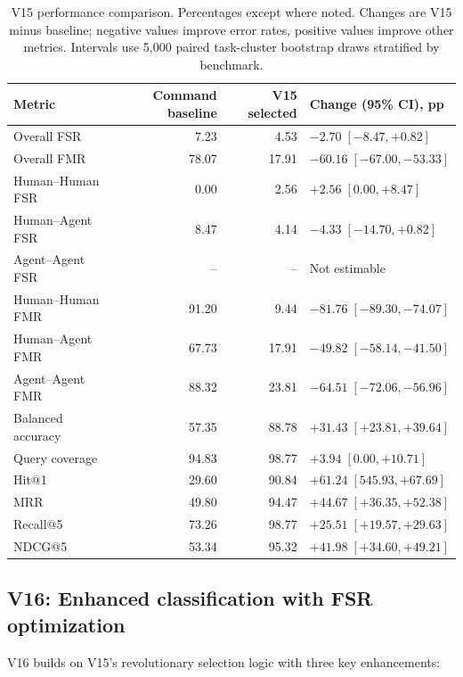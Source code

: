 \begin{table}[tb]
\centering
\small
\setlength{\tabcolsep}{4pt}
\begin{tabularx}{\linewidth}{l r r X}
\toprule
Metric & Command baseline & V15 selected & Change (95\% CI), pp \\
\midrule
Overall FSR & 7.23 & 4.53 & $-2.70\;[-8.47,+0.82]$ \\
Overall FMR & 78.07 & 17.91 & $-60.16\;[-67.00,-53.33]$ \\
Human--Human FSR & 0.00 & 2.56 & $+2.56\;[0.00,+8.47]$ \\
Human--Agent FSR & 8.47 & 4.14 & $-4.33\;[-14.70,+0.82]$ \\
Agent--Agent FSR & -- & -- & Not estimable \\
Human--Human FMR & 91.20 & 9.44 & $-81.76\;[-89.30,-74.07]$ \\
Human--Agent FMR & 67.73 & 17.91 & $-49.82\;[-58.14,-41.50]$ \\
Agent--Agent FMR & 88.32 & 23.81 & $-64.51\;[-72.06,-56.96]$ \\
Balanced accuracy & 57.35 & 88.78 & $+31.43\;[+23.81,+39.64]$ \\
Query coverage & 94.83 & 98.77 & $+3.94\;[0.00,+10.71]$ \\
Hit@1 & 29.60 & 90.84 & $+61.24\;[545.93,+67.69]$ \\
MRR & 49.80 & 94.47 & $+44.67\;[+36.35,+52.38]$ \\
Recall@5 & 73.26 & 98.77 & $+25.51\;[+19.57,+29.63]$ \\
NDCG@5 & 53.34 & 95.32 & $+41.98\;[+34.60,+49.21]$ \\
\bottomrule
\end{tabularx}
\caption{V15 performance comparison. Percentages except where noted. Changes are V15 minus baseline; negative values improve error rates, positive values improve other metrics. Intervals use 5,000 paired task-cluster bootstrap draws stratified by benchmark.}
\label{tab:balanced-innovation-v15}
\end{table}

\subsection{V16: Enhanced classification with FSR optimization}

V16 builds on V15's revolutionary selection logic with three key enhancements:

